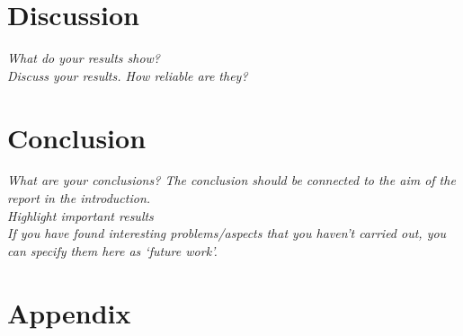 \documentclass[11pt, fleqn, titlepage]{article}
\begin{document}
\section{Discussion}
\textit{What do your results show? \\ Discuss your results. How reliable are they?}

\section{Conclusion}
\textit{What are your conclusions? The conclusion should be connected to the aim of the report in the introduction. \\ Highlight important results \\ If you have found interesting problems/aspects that you haven’t carried out, you can specify them here as ‘future work’.}

\section{Appendix}




\end{document}
